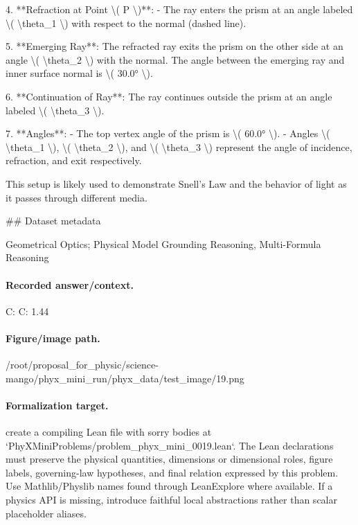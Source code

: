 4. **Refraction at Point \textbackslash{}( P \textbackslash{})**:
   - The ray enters the prism at an angle labeled \textbackslash{}( \textbackslash{}theta\_1 \textbackslash{}) with respect to the normal (dashed line).
   
5. **Emerging Ray**: The refracted ray exits the prism on the other side at an angle \textbackslash{}( \textbackslash{}theta\_2 \textbackslash{}) with the normal. The angle between the emerging ray and inner surface normal is \textbackslash{}( 30.0° \textbackslash{}).

6. **Continuation of Ray**: The ray continues outside the prism at an angle labeled \textbackslash{}( \textbackslash{}theta\_3 \textbackslash{}). 

7. **Angles**:
   - The top vertex angle of the prism is \textbackslash{}( 60.0° \textbackslash{}).
   - Angles \textbackslash{}( \textbackslash{}theta\_1 \textbackslash{}), \textbackslash{}( \textbackslash{}theta\_2 \textbackslash{}), and  \textbackslash{}( \textbackslash{}theta\_3 \textbackslash{}) represent the angle of incidence, refraction, and exit respectively.

This setup is likely used to demonstrate Snell's Law and the behavior of light as it passes through different media.

\#\# Dataset metadata

Geometrical Optics; Physical Model Grounding Reasoning, Multi-Formula Reasoning

\paragraph{Recorded answer/context.}
C: C: 1.44

\paragraph{Figure/image path.}
/root/proposal\_for\_physic/science-mango/phyx\_mini\_run/phyx\_data/test\_image/19.png

\paragraph{Formalization target.}
create a compiling Lean file with sorry bodies at `PhyXMiniProblems/problem\_phyx\_mini\_0019.lean`. The Lean declarations must preserve the physical quantities, dimensions or dimensional roles, figure labels, governing-law hypotheses, and final relation expressed by this problem.
Use Mathlib/Physlib names found through LeanExplore where available. If a physics API is missing, introduce faithful local abstractions rather than scalar placeholder aliases.

